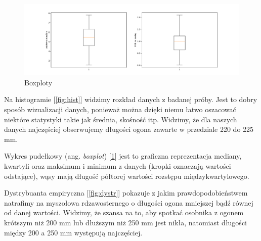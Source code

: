 \documentclass{article}
\theoremstyle{break}
\begin{document}
\begin{figure}[H]
	\begin{center}
		\includegraphics[scale=0.43]{box.pdf}
		\caption{Boxploty}
		\label{fig:box}
	\end{center}
\end{figure}


Na histogramie [\ref{fig:hist}] widzimy rozkład danych z badanej próby. Jest to dobry sposób wizualizacji danych, ponieważ można dzięki niemu łatwo oszacować niektóre statystyki takie jak średnia, skośność itp. Widzimy, że dla naszych danych najczęściej obserwujemy długości ogona zawarte w przedziale 220 do 225 mm.

Wykres pudełkowy (ang. \textit{boxplot}) [\ref{fig:box}] jest to graficzna reprezentacja mediany, kwartyli oraz maksimum i minimum z danych (kropki oznaczają wartości odstające), wąsy mają długość półtorej wartości rozstępu międzykwartylowego.

Dystrybuanta empiryczna [\ref{fig:dystr}] pokazuje z jakim prawdopodobieństwem natrafimy na myszołowa rdzawosternego o długości ogona mniejszej bądź równej od danej wartości. Widzimy, że szansa na to, aby spotkać osobnika z ogonem krótszym niż 200 mm lub dłuższym niż 250 mm jest nikła, natomiast długości między 200 a 250 mm występują najczęściej.
\end{document}
